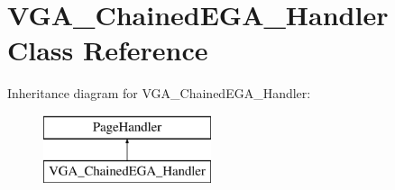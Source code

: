 \hypertarget{classVGA__ChainedEGA__Handler}{\section{V\-G\-A\-\_\-\-Chained\-E\-G\-A\-\_\-\-Handler Class Reference}
\label{classVGA__ChainedEGA__Handler}
}
Inheritance diagram for V\-G\-A\-\_\-\-Chained\-E\-G\-A\-\_\-\-Handler\-:\begin{figure}[H]
\begin{center}
\leavevmode
\includegraphics[height=2.000000cm]{classVGA__ChainedEGA__Handler}
\end{center}
\end{figure}
